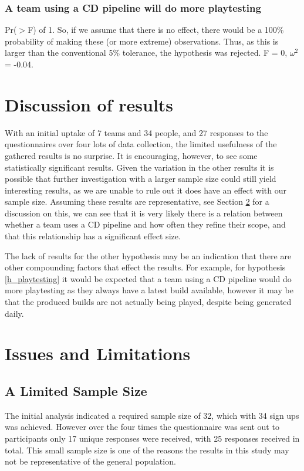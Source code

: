 \documentclass[journal]{IEEEtran}
\begin{document}
        \subsubsection{A team using a CD pipeline will do more playtesting}
            Pr($>$F) of 1. So, if we assume that there is no effect, there would be a 100\% probability of making these (or more extreme) observations. Thus, as this is larger than the conventional 5\% tolerance, the hypothesis was rejected. F = 0, $\omega^2$ = -0.04. \\

\section{Discussion of results}
    With an initial uptake of 7 teams and 34 people, and 27 responses to the questionnaires over four lots of data collection, the limited usefulness of the gathered results is no surprise. It is encouraging, however, to see some statistically significant results. Given the variation in the other results it is possible that further investigation with a larger sample size could still yield interesting results, as we are unable to rule out it does have an effect with our sample size. Assuming these results are representative, see Section \ref{IssuesandLimitations} for a discussion on this, we can see that it is very likely there is a relation between whether a team uses a CD pipeline and how often they refine their scope, and that this relationship has a significant effect size.

    The lack of results for the other hypothesis may be an indication that there are other compounding factors that effect the results. For example, for hypothesis \ref{h_playtesting} it would be expected that a team using a CD pipeline would do more playtesting as they always have a latest build available, however it may be that the produced builds are not actually being played, despite being generated daily.

\section{Issues and Limitations} \label{IssuesandLimitations}
    \subsection{A Limited Sample Size}
        The initial analysis indicated a required sample size of 32, which with 34 sign ups was achieved. However over the four times the questionnaire was sent out to participants only 17 unique responses were received, with 25 responses received in total. This small sample size is one of the reasons the results in this study may not be representative of the general population. \\
\end{document}
